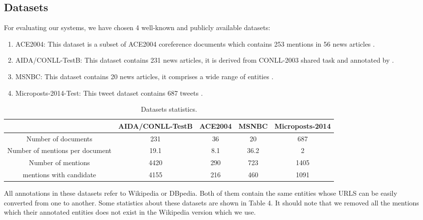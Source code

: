 \documentclass{llncs}
\begin{document}
\subsection{Datasets}
For evaluating our systems, we have chosen 4 well-known and publicly available datasets:
\begin{enumerate}
\item ACE2004: This dataset is a subset of ACE2004 coreference documents which contains 253 mentions in  56 news articles \cite{ratinov_local_2011}.
\item AIDA/CONLL-TestB: This dataset contains 231 news articles, it is derived from CONLL-2003 shared task and annotated by \cite{hoffart_robust_2011}.
\item MSNBC: This dataset contains  20 news articles, it comprises a wide range of entities  \cite{cucerzan_large-scale_2007}.
\item Microposts-2014-Test: This tweet dataset contains 687 tweets \cite{usbeck_gerbil_2015}.
\end{enumerate}

\begin{table*}[!h]
\centering
\begin{tabular}{|c|c|c|c|c|}
    \hline 
  & AIDA/CONLL-TestB& ACE2004& MSNBC& Microposts-2014\\
   \hline 
    Number of documents 		         & 231   & 36  & 20   & 687 \\
    Number of mentions per document&19.1     &  8.1    &36.2   & 2 \\
    Number of mentions                       & 4420& 290 & 723 & 1405\\
    mentions with candidate        & 4155 & 216 & 460 & 1091\\

        \hline  
\end{tabular}
\caption{Datasets statistics. }
\end{table*}

All annotations in these datasets refer to Wikipedia or DBpedia. Both of  them contain the same entities whose URLS can be easily converted from one to another. Some statistics about these datasets are shown in Table 4. It should note that we removed all the mentions which their annotated entities does not exist in the Wikipedia version which we use.
\end{document}
